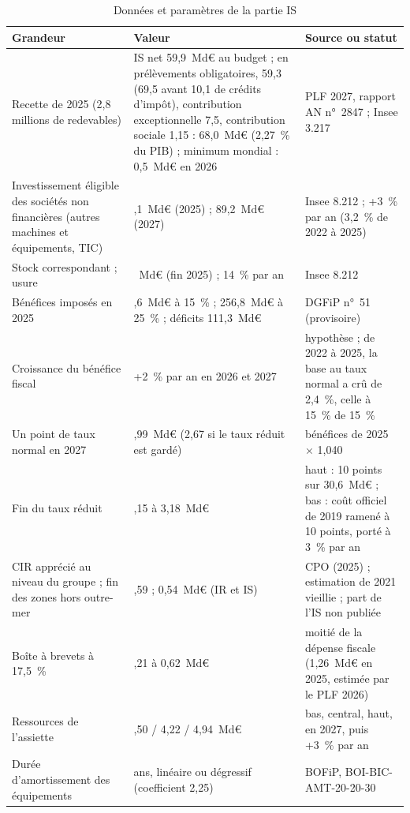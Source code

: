 \documentclass[11pt,a4paper]{article}
\begin{document}
\begin{table}[!htbp]\centering\scriptsize
\caption{Données et paramètres de la partie IS}\label{tab:is_calibrage}
\begin{tabularx}{\linewidth}{@{}>{\raggedright\arraybackslash}p{4.6cm}>{\raggedright\arraybackslash}p{3.3cm}>{\raggedright\arraybackslash}X@{}}
\toprule
Grandeur & Valeur & Source ou statut \\
\midrule
Recette de 2025 (2,8 millions de redevables) & IS net 59,9~Md€ au budget ; en prélèvements obligatoires, 59,3 (69,5
avant 10,1 de crédits d'impôt), contribution exceptionnelle 7,5, contribution sociale 1,15 : 68,0~Md€ (2,27~\% du PIB) ;
minimum mondial : 0,5~Md€ en 2026 & PLF 2027, rapport AN n°~2847 ; Insee 3.217 \\
Investissement éligible des sociétés non financières (autres machines et équipements, TIC) & 84,1~Md€ (2025) ; 89,2~Md€
(2027) & Insee 8.212 ; +3~\% par an (3,2~\% de 2022 à 2025) \\
Stock correspondant ; usure & 541~Md€ (fin 2025) ; 14~\% par an & Insee 8.212 \\
Bénéfices imposés en 2025 & 30,6~Md€ à 15~\% ; 256,8~Md€ à 25~\% ; déficits 111,3~Md€ & DGFiP n°~51 (provisoire) \\
Croissance du bénéfice fiscal & +2~\% par an en 2026 et 2027 & hypothèse ; de 2022 à 2025, la base au taux normal a crû
de 2,4~\%, celle à 15~\% de 15~\% \\
Un point de taux normal en 2027 & 2,99~Md€ (2,67 si le taux réduit est gardé) & bénéfices de 2025 $\times$ 1,040 \\
Fin du taux réduit & 2,15 à 3,18~Md€ & haut : 10 points sur 30,6~Md€ ; bas : coût officiel de 2019 ramené à 10 points,
porté à 3~\% par an \\
CIR apprécié au niveau du groupe ; fin des zones hors outre-mer & 0,59 ; 0,54~Md€ (IR et IS) & CPO (2025) ; estimation
de 2021 vieillie ; part de l'IS non publiée \\
Boîte à brevets à 17,5~\% & 0,21 à 0,62~Md€ & moitié de la dépense fiscale (1,26~Md€ en 2025, estimée par le PLF 2026) \\
Ressources de l'assiette & 3,50 / 4,22 / 4,94~Md€ & bas, central, haut, en 2027, puis +3~\% par an \\
Durée d'amortissement des équipements & 7 ans, linéaire ou dégressif (coefficient 2,25) & BOFiP, BOI-BIC-AMT-20-20-30 \\
\bottomrule
\end{tabularx}
\end{table}
\end{document}
